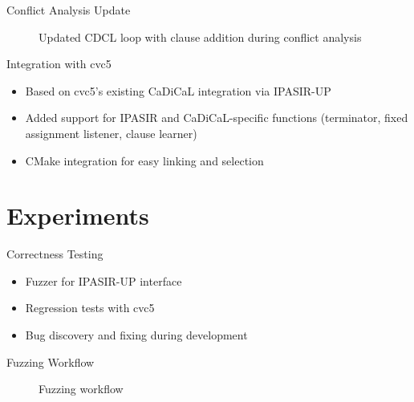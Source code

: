 \documentclass{beamer}
\begin{document}
\begin{frame}{Conflict Analysis Update}
  \begin{figure}
    \centering
    
    \caption{Updated CDCL loop with clause addition during conflict analysis}
  \end{figure}
\end{frame}

\begin{frame}{Integration with cvc5}
  \begin{itemize}
    \item Based on cvc5's existing CaDiCaL integration via IPASIR-UP
    \item Added support for IPASIR and CaDiCaL-specific functions (terminator, fixed assignment listener, clause learner)
    \item CMake integration for easy linking and selection
  \end{itemize}
\end{frame}

\section{Experiments}

\begin{frame}{Correctness Testing}
  \begin{itemize}
    \item Fuzzer for IPASIR-UP interface
    \item Regression tests with cvc5
    \item Bug discovery and fixing during development
  \end{itemize}
\end{frame}

\begin{frame}{Fuzzing Workflow}
  \begin{figure}
    \centering
    
    \caption{Fuzzing workflow}
  \end{figure}
\end{frame}
\end{document}
